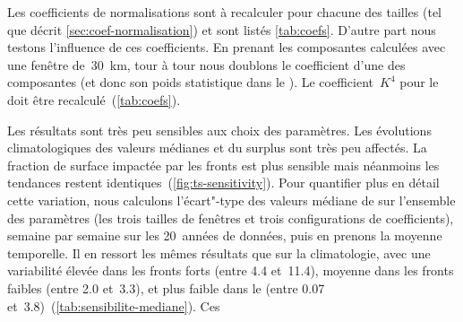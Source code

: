 Les coefficients de normalisations sont à recalculer pour chacune des tailles (tel que décrit \cref{sec:coef-normalisation}) et sont listés \cref{tab:coefs}.
D'autre part nous testons l'influence de ces coefficients. En prenant les composantes calculées avec une fenêtre de~\qty{30}{\km}, tour à tour nous doublons le coefficient d'une des composantes (et donc son poids statistique dans le ). Le coefficient~\(K^4\) pour le  doit être recalculé~(\cref{tab:coefs}).

\begin{table}
  \centering
  \begin{siunitText}
  \end{siunitText}
  \caption[]{%
    Coefficients de normalisation pour les différents paramètres utilisés.
  }
  \label{tab:coefs}
\end{table}

Les résultats sont très peu sensibles aux choix des paramètres.
Les évolutions climatologiques des valeurs médianes et du surplus sont très peu affectés. La fraction de surface impactée par les fronts est plus sensible mais néanmoins les tendances restent identiques~(\cref{fig:ts-sensitivity}).
Pour quantifier plus en détail cette variation, nous calculons l'écart"-type des valeurs médiane de  sur l'ensemble des paramètres (les trois tailles de fenêtres et trois configurations de coefficients), semaine par semaine sur les 20~années de données, puis en prenons la moyenne temporelle.
Il en ressort les mêmes résultats que sur la climatologie, avec une variabilité élevée dans les fronts forts (entre \qty{4.4}{\mugm} et~\qty{11.4}{\mugm}), moyenne dans les fronts faibles (entre \qty{2.0}{\mugm} et~\qty{3.3}{\mugm}), et plus faible dans le  (entre \qty{0.07}{\mugm} et~\qty{3.8}{\mugm})~(\cref{tab:sensibilite-mediane}).
Ces


